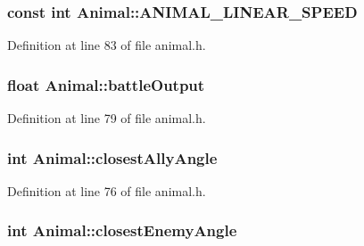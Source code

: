 \hypertarget{class_animal_a4468a9e53e199e90deccd07d2315f13a}{
\subsubsection[{A\-N\-I\-M\-A\-L\-\_\-\-L\-I\-N\-E\-A\-R\-\_\-\-S\-P\-E\-E\-D}]{\setlength{\rightskip}{0pt plus 5cm}const int Animal\-::\-A\-N\-I\-M\-A\-L\-\_\-\-L\-I\-N\-E\-A\-R\-\_\-\-S\-P\-E\-E\-D\hspace{0.3cm}{\ttfamily [protected]}}}\label{class_animal_a4468a9e53e199e90deccd07d2315f13a}


Definition at line 83 of file animal.\-h.

\hypertarget{class_animal_a3db09e6629852d9a54dc5b6648d3fb28}{
\subsubsection[{battle\-Output}]{\setlength{\rightskip}{0pt plus 5cm}float Animal\-::battle\-Output\hspace{0.3cm}{\ttfamily [protected]}}}\label{class_animal_a3db09e6629852d9a54dc5b6648d3fb28}


Definition at line 79 of file animal.\-h.

\hypertarget{class_animal_a53819180fe828fe2b68c7bbd7932ec9d}{
\subsubsection[{closest\-Ally\-Angle}]{\setlength{\rightskip}{0pt plus 5cm}int Animal\-::closest\-Ally\-Angle\hspace{0.3cm}{\ttfamily [protected]}}}\label{class_animal_a53819180fe828fe2b68c7bbd7932ec9d}


Definition at line 76 of file animal.\-h.

\hypertarget{class_animal_a38e826603b1d70a75c89c59964d7e34e}{
\subsubsection[{closest\-Enemy\-Angle}]{\setlength{\rightskip}{0pt plus 5cm}int Animal\-::closest\-Enemy\-Angle\hspace{0.3cm}{\ttfamily [protected]}}}\label{class_animal_a38e826603b1d70a75c89c59964d7e34e}


